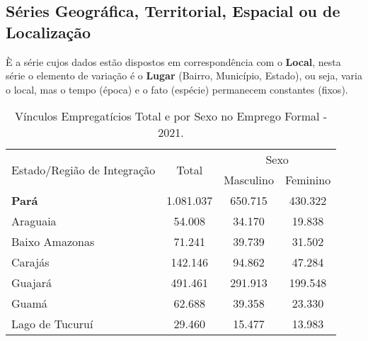 \newpage

\subsection{Séries Geográfica, Territorial, Espacial ou de Localização}

\inic È a série cujos dados estão dispostos em correspondência com o \textbf{Local}, nesta série o elemento de variação é o \textbf{Lugar} (Bairro, Município, Estado), ou seja, varia o local, mas o tempo (época) e o fato (espécie) permanecem constantes (fixos).




\begin{table}[!htb]
\centering
    {
    \caption{Vínculos Empregatícios Total e por Sexo no Emprego Formal - 2021.}
    \label{obitos2}
    \vspace{0.1cm}
\begin{tabular}{l|c|c|c}
\hline\hline
\multirow{2}{*}{Estado/Região de Integração} & \multicolumn{1}{c|}{\multirow{2}{*}{Total}} & \multicolumn{2}{c}{Sexo}                                     \\ \cline{3-4} 
                           & \multicolumn{1}{c|}{}                       & \multicolumn{1}{c|}{Masculino} & \multicolumn{1}{c}{Feminino} \\ \cline{1-2}
\hline\hline
\textbf{Pará}              &  1.081.037                                 &  650.715                      &   430.322                    \\
\hline
Araguaia                   &  54.008                                    &  34.170                       &   19.838                     \\
Baixo Amazonas             &  71.241                                    &  39.739                       &   31.502                     \\
Carajás                    &  142.146                                   &  94.862                       &   47.284                     \\
Guajará                    &  491.461                                   &  291.913                      &   199.548                     \\
Guamá                      &  62.688                                    &  39.358                       &   23.330                      \\
Lago de Tucuruí            &  29.460                                    &  15.477                       &   13.983                       \\

\end{tabular}}
\end{table}

